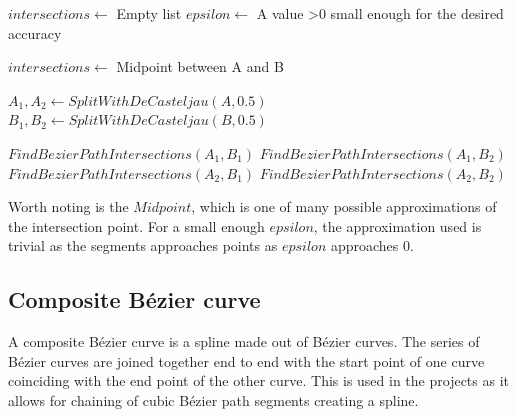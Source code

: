         \vspace{1cm}
        \begin{algorithmic}
            \State $intersections \gets$ Empty list
            \State $epsilon \gets$ A value >0 small enough for the desired accuracy
                    \State \Return
                \EndIf

                    \State $intersections \gets$ Midpoint between A and B
                    \State \Return
                \EndIf

                \State $A_1, A_2 \gets SplitWithDeCasteljau(A, 0.5)$
                \State $B_1, B_2 \gets SplitWithDeCasteljau(B, 0.5)$

                \State $FindBezierPathIntersections(A_1, B_1)$
                \State $FindBezierPathIntersections(A_1, B_2)$
                \State $FindBezierPathIntersections(A_2, B_1)$
                \State $FindBezierPathIntersections(A_2, B_2)$
            \EndProcedure
        \end{algorithmic}
        \vspace{1cm}

        Worth noting is the $Midpoint$, which is one of many possible approximations of the intersection point. For a small enough $epsilon$, the approximation used is trivial as the segments approaches points as $epsilon$ approaches 0.

    \subsection{Composite Bézier curve}
        A composite Bézier curve is a spline made out of Bézier curves. The series of Bézier curves are joined together end to end with the start point of one curve coinciding with the end point of the other curve. This is used in the projects as it allows for chaining of cubic Bézier path segments creating a spline. 